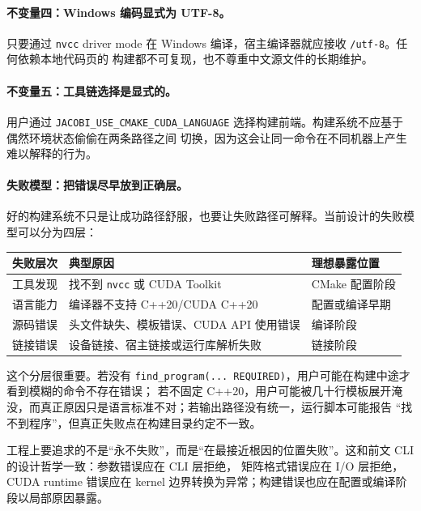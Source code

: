 \paragraph{不变量四：Windows 编码显式为 UTF-8。}
只要通过 \texttt{nvcc} driver mode 在 Windows 编译，宿主编译器就应接收 \texttt{/utf-8}。任何依赖本地代码页的
构建都不可复现，也不尊重中文源文件的长期维护。

\paragraph{不变量五：工具链选择是显式的。}
用户通过 \texttt{JACOBI\_USE\_CMAKE\_CUDA\_LANGUAGE} 选择构建前端。构建系统不应基于偶然环境状态偷偷在两条路径之间
切换，因为这会让同一命令在不同机器上产生难以解释的行为。

\paragraph{失败模型：把错误尽早放到正确层。}

好的构建系统不只是让成功路径舒服，也要让失败路径可解释。当前设计的失败模型可以分为四层：

\begin{table}[h]
    \centering
    \begin{tabular}{lll}
        \toprule
        失败层次 & 典型原因                             & 理想暴露位置     \\
        \midrule
        工具发现 & 找不到 \texttt{nvcc} 或 CUDA Toolkit & CMake 配置阶段 \\
        语言能力 & 编译器不支持 C++20/CUDA C++20          & 配置或编译早期    \\
        源码错误 & 头文件缺失、模板错误、CUDA API 使用错误         & 编译阶段       \\
        链接错误 & 设备链接、宿主链接或运行库解析失败                & 链接阶段       \\
        \bottomrule
    \end{tabular}
\end{table}

这个分层很重要。若没有 \texttt{find\_program(... REQUIRED)}，用户可能在构建中途才看到模糊的命令不存在错误；
若不固定 C++20，用户可能被几十行模板展开淹没，而真正原因只是语言标准不对；若输出路径没有统一，运行脚本可能报告
“找不到程序”，但真正失败点在构建目录约定不一致。

工程上要追求的不是“永不失败”，而是“在最接近根因的位置失败”。这和前文 CLI 的设计哲学一致：参数错误应在 CLI 层拒绝，
矩阵格式错误应在 I/O 层拒绝，CUDA runtime 错误应在 kernel 边界转换为异常；构建错误也应在配置或编译阶段以局部原因暴露。

